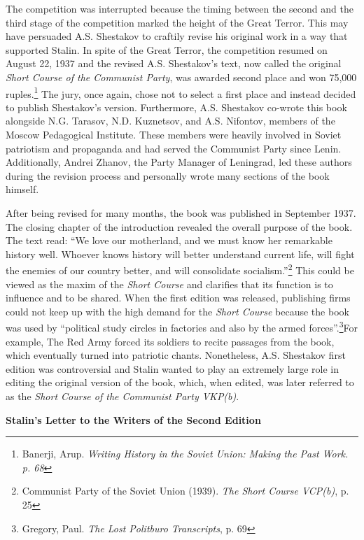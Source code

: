 \documentclass[a4paper, twocolumn]{article}
\begin{document}
The competition was interrupted because the timing between the second
and the third stage of the competition marked the height of the Great
Terror. This may have persuaded A.S. Shestakov to craftily revise his
original work in a way that supported Stalin. In spite of the Great
Terror, the competition resumed on August 22, 1937 and the revised
A.S. Shestakov's text, now called the original \emph{Short Course of the
Communist Party}, was awarded second place and won 75,000 ruples.\footnote{Banerji, Arup. \emph{Writing History in the Soviet Union: Making the Past Work. p.  68}}
The jury, once again, chose not to select a first place and instead
decided to publish Shestakov's version. Furthermore, A.S. Shestakov
co-wrote this book alongside N.G. Tarasov, N.D. Kuznetsov, and
A.S. Nifontov, members of the Moscow Pedagogical Institute. These
members were heavily involved in Soviet patriotism and propaganda and
had served the Communist Party since Lenin. Additionally, Andrei
Zhanov, the Party Manager of Leningrad, led these authors during the
revision process and personally wrote many sections of the book
himself.

After being revised for many months, the book was published in
September 1937.  The closing chapter of the introduction revealed the
overall purpose of the book.  The text read: ``We love our motherland,
and we must know her remarkable history well. Whoever knows history
will better understand current life, will fight the enemies of our
country better, and will consolidate socialism.''\footnote{Communist Party of the Soviet Union (1939). \emph{The Short Course VCP(b)}, p. 25} This could be
viewed as the maxim of the \emph{Short Course} and clarifies that its
function is to influence and to be shared. When the first edition was
released, publishing firms could not keep up with the high demand for
the \emph{Short Course} because the book was used by “political study circles
in factories and also by the armed forces”.\footnote{Gregory, Paul. \emph{The Lost Politburo Transcripts}, p. 69}For example, The Red
Army forced its soldiers to recite passages from the book, which
eventually turned into patriotic chants. Nonetheless, A.S. Shestakov
first edition was controversial and Stalin wanted to play an extremely
large role in editing the original version of the book, which, when
edited, was later referred to as the \emph{Short Course of the Communist
Party VKP(b)}.


\begin{center}\textbf{Stalin's Letter to the Writers of the Second Edition}\end{center}
\end{document}
